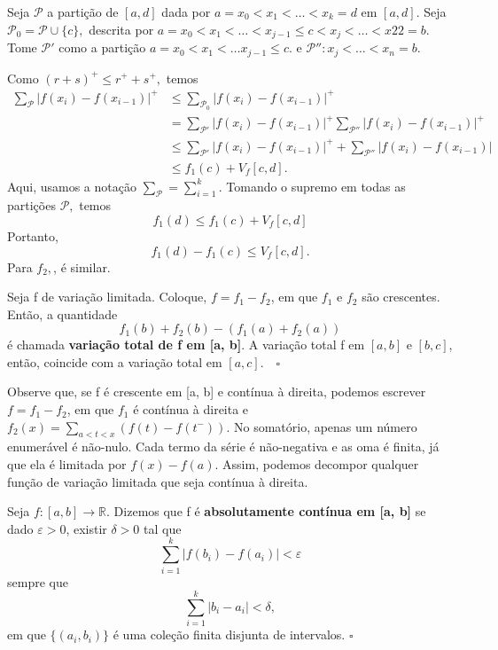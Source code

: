 \documentclass[measure_theory.tex]{subfiles}
\begin{document}
\begin{proof*}
	Seja \(\mathcal{P}\) a partição de \([a, d]\) dada por \(a = x_{0} < x_1 < \dotsc < x_{k} = d\) em \([a, d].\) Seja \(\mathcal{P}_{0} = \mathcal{P}\cup \{c\},\) descrita por
	\(a = x_{0} < x_1 < \dotsc < x_{j-1}\leq c < x_{j} < \dotsc <x22 = b.\) Tome \(\mathcal{P}'\) como a partição \(a = x_{0} < x_1 <\dotsc x_{j-1}\leq c\).
	e \(\mathcal{P}'': x_{j} < \dotsc < x_{n}=b\).

	Como \((r+s)^{+} \leq r^{+} + s^{+}, \) temos
	\begin{align*}
		\sum\limits_{\mathcal{P}}^{}|f(x_{i}) - f(x_{i-1})|^{+} & \leq \sum\limits_{\mathcal{P}_{0}}^{}|f(x_{i}) - f(x_{i-1})|^{+}                                                    \\
		                                                        & = \sum\limits_{\mathcal{P}'}^{}|f(x_{i}) - f(x_{i-1})|^{+}\sum\limits_{\mathcal{P}''}^{}|f(x_{i}) - f(x_{i-1})|^{+} \\
		                                                        & \leq \sum\limits_{\mathcal{P}'}^{}|f(x_{i})-f(x_{i-1})|^{+} + \sum\limits_{\mathcal{P}''}^{}|f(x_{i}) - f(x_{i-1})| \\
		                                                        & \leq f_1(c) + V_f[c, d].
	\end{align*}
	Aqui, usamos a notação \(\sum\limits_{\mathcal{P}}^{} = \sum\limits_{i=1}^{k}.\) Tomando o supremo em todas as partições \(\mathcal{P},\) temos
	\[
		f_1(d) \leq f_1(c) + V_f[c, d]
	\]
	Portanto,
	\[
		f_1(d) - f_1(c) \leq V_f[c, d].
	\]
	Para \(f_2,\), é similar. \qedsymbol
\end{proof*}
\begin{def*}
	Seja f de variação limitada. Coloque, \(f = f_1 - f_2\), em que \(f_1\) e \(f_2\) são crescentes. Então, a quantidade
	\[
		f_1(b) + f_2(b) - (f_1(a) + f_2(a))
	\]
	é chamada \textbf{variação total de f em [a, b]}. A variação total f em \([a, b]\) e \([b, c]\), então, coincide com a variação total em \([a, c]. \quad \square\)
\end{def*}
Observe que, se f é crescente em [a, b] e contínua à direita, podemos escrever \(f = f_1 - f_2\), em que \(f_1\) é contínua à direita e \(f_2(x) = \sum\limits_{a < t < x}^{}(f(t) - f(t^{-})).\) No somatório, apenas um número enumerável é não-nulo. Cada termo da série é não-negativa e as oma é finita, já que ela é limitada por \(f(x)-f(a).\) Assim, podemos
decompor qualquer função de variação limitada que seja contínua à direita.
\begin{def*}
	Seja \(f:[a, b]\rightarrow \mathbb{R}\). Dizemos que f é \textbf{absolutamente contínua em [a, b]} se dado \(\varepsilon  > 0\), existir \(\delta  > 0\) tal que
	\[
		\sum\limits_{i=1}^{k}|f(b_{i}) - f(a_{i})| < \varepsilon
	\]
	sempre que
	\[
		\sum\limits_{i=1}^{k}|b_{i} - a_{i}|  < \delta,
	\]
	em que \(\{(a_{i}, b_{i})\}\) é uma coleção finita disjunta de intervalos. \(\square\)
\end{def*}
\end{document}

